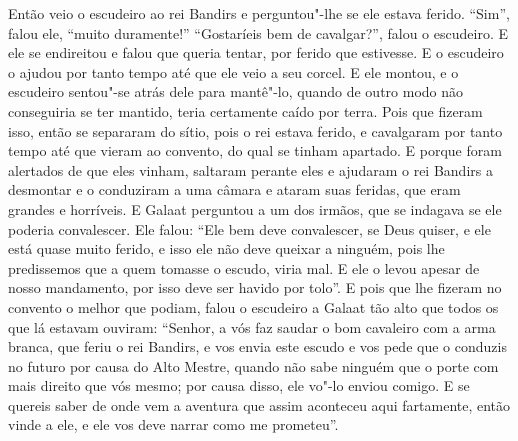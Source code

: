 Então veio o escudeiro ao rei Bandirs e perguntou"-lhe se ele estava ferido.
“Sim”, falou ele, “muito duramente!” “Gostaríeis bem de cavalgar?”, falou o
escudeiro. E ele se endireitou e falou que queria tentar, por ferido que
estivesse. E o escudeiro o ajudou por tanto tempo até que ele veio a seu
corcel. E ele montou, e o escudeiro sentou"-se atrás dele para mantê"-lo, quando
de outro modo não conseguiria se ter mantido, teria certamente caído por terra.
Pois que fizeram isso, então se separaram do sítio, pois o rei estava ferido, e
cavalgaram por tanto tempo até que vieram ao convento, do qual se tinham
apartado. E porque foram alertados de que eles vinham, saltaram perante eles e
ajudaram o rei Bandirs a desmontar e o conduziram a uma câmara e ataram suas
feridas, que eram grandes e horríveis. E Galaat perguntou a um dos irmãos, que
se indagava se ele poderia convalescer. Ele falou: “Ele bem deve convalescer,
se Deus quiser, e ele está quase muito ferido, e isso ele não deve queixar a
ninguém, pois lhe predissemos que a quem tomasse o escudo, viria mal. E ele
o levou apesar de nosso mandamento, por isso deve ser havido por tolo”. E pois
que lhe fizeram no convento o melhor que podiam, falou o escudeiro a Galaat tão
alto que todos os que lá estavam ouviram: “Senhor, a vós faz saudar o bom
cavaleiro com a arma branca, que feriu o rei Bandirs, e vos envia este escudo e
vos pede que o conduzis no futuro por causa do Alto Mestre, quando não sabe
ninguém que o porte com mais direito que vós mesmo; por causa disso, ele vo"-lo
enviou comigo. E se quereis saber de onde vem a aventura que assim aconteceu
aqui fartamente, então vinde a ele, e ele vos deve narrar como me prometeu”.  

